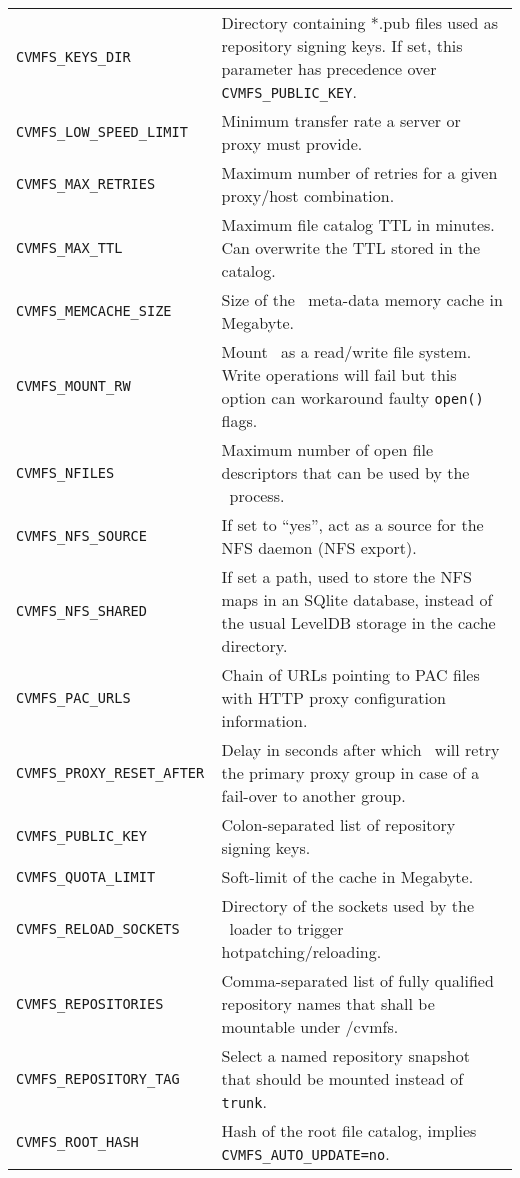 \begin{longtable}{lX}
		\tt CVMFS\_KEYS\_DIR				& Directory containing *.pub files used as repository signing keys.  If set, this parameter has precedence over \texttt{CVMFS\_PUBLIC\_KEY}.\\
		\tt CVMFS\_LOW\_SPEED\_LIMIT		& Minimum transfer rate a server or proxy must provide.\\
		\tt CVMFS\_MAX\_RETRIES			& Maximum number of retries for a given proxy/host combination.\\
		\tt CVMFS\_MAX\_TTL				& Maximum file catalog TTL in minutes.  Can overwrite the TTL stored in the catalog.\\
		\tt CVMFS\_MEMCACHE\_SIZE			& Size of the \cvmfs\ meta-data memory cache in Megabyte.\\
		\tt CVMFS\_MOUNT\_RW				& Mount \cvmfs\ as a read/write file system.  Write operations will fail but this option can workaround faulty \texttt{open()} flags.\\
		\tt CVMFS\_NFILES					& Maximum number of open file descriptors that can be used by the \cvmfs\ process.\\
		\tt CVMFS\_NFS\_SOURCE				& If set to ``yes'', act as a source for the NFS daemon (NFS export).\\
		\tt CVMFS\_NFS\_SHARED				& If set a path, used to store the NFS maps in an SQlite database, instead of the usual LevelDB storage in the cache directory.\\
		\tt CVMFS\_PAC\_URLS				& Chain of URLs pointing to PAC files with HTTP proxy configuration information.\\
		\tt CVMFS\_PROXY\_RESET\_AFTER		& Delay in seconds after which \cvmfs\ will retry the primary proxy group in case of a fail-over to another group.\\
		\tt CVMFS\_PUBLIC\_KEY				& Colon-separated list of repository signing keys.\\
		\tt CVMFS\_QUOTA\_LIMIT			& Soft-limit of the cache in Megabyte.\\
		\tt CVMFS\_RELOAD\_SOCKETS			& Directory of the sockets used by the \cvmfs\ loader to trigger hotpatching/reloading.\\
		\tt CVMFS\_REPOSITORIES			& Comma-separated list of fully qualified repository names that shall be mountable under /cvmfs.\\
		\tt CVMFS\_REPOSITORY\_TAG			& Select a named repository snapshot that should be mounted instead of \texttt{trunk}.\\
		\tt CVMFS\_ROOT\_HASH				& Hash of the root file catalog, implies \texttt{CVMFS\_AUTO\_UPDATE=no}.\\

\end{longtable}
